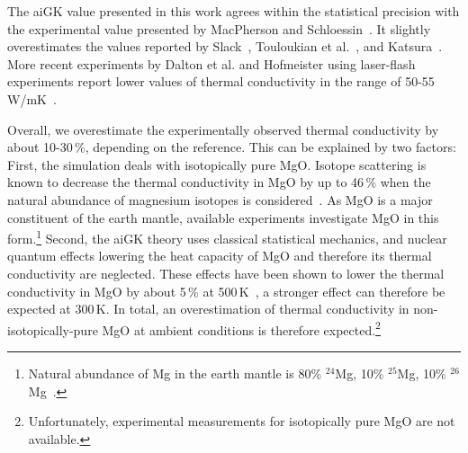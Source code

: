 The aiGK value presented in this work agrees within the statistical precision with the experimental value presented by MacPherson and Schloessin~\cite{Macpherson.1983}. It slightly overestimates the values reported by Slack~\cite{Slack.1962}, Touloukian et al.~\cite{touloukian1970}, and Katsura~\cite{Katsura.1997}. More recent experiments by Dalton et al. and Hofmeister using laser-flash experiments report lower values of thermal conductivity in the range of 50-55\,W/mK~\cite{Dalton.2013,Hofmeister.2014}.

Overall, we overestimate the experimentally observed thermal conductivity by about 10-30\,\%, depending on the reference. This can be explained by two factors: First, the simulation deals with isotopically pure MgO. Isotope scattering is known to decrease the thermal conductivity in MgO by up to 46\,\% when the natural abundance of magnesium isotopes is considered~\cite{Slack.1962,Tang.2010}. As MgO is a major constituent of the earth mantle, available experiments investigate MgO in this form.\footnote{Natural abundance of Mg in the earth mantle is 80\% $^{24}$Mg, 10\% $^{25}$Mg, 10\% $^{26}$Mg~\cite{Berglund.2011}.} Second, the aiGK theory uses classical statistical mechanics, and nuclear quantum effects lowering the heat capacity of MgO and therefore its thermal conductivity are neglected. These effects have been shown to lower the thermal conductivity in MgO by about 5\,\% at 500\,K~\cite{Puligheddu.2019}, a stronger effect can therefore be expected at 300\,K. In total, an overestimation of thermal conductivity in non-isotopically-pure MgO at ambient conditions is therefore expected.\footnote{Unfortunately, experimental measurements for isotopically pure MgO are not available.}

